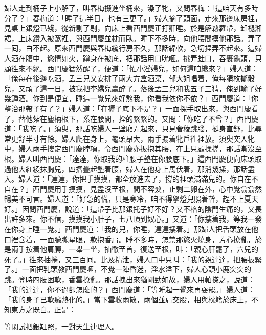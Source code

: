 婦人走到桶子上小解了，叫春梅掇進坐桶來，澡了牝，又問春梅：「這咱天有多時分了？」春梅道：「睡了這半日，也有三更了。」婦人摘了頭面，走來那邊床房裡，見桌上銀燈已殘，從新剔了剔，向床上看西門慶正打鼾睡。於是解鬆羅帶，卸褪湘裙，上床鑽入被窩裡，與西門慶並枕而臥。睡下不多時，向他腰間摸他那話。弄了一囘，白不起。原來西門慶與春梅纔行房不久，那話綿軟，急切捏弄不起來。這婦人酒在腹中，慾情如火，蹲身在被底，把那話用口吮咂。挑弄蛙口，吞裹龜頭，只顧徃來不絕。西門慶猛然醒了，便道：「恠小淫婦兒，如何這咱纔來？」婦人道：「俺每在後邊吃酒，孟三兒又安排了兩大方盒酒菜，郁大姐唱着，俺每猜枚擲骰兒，又頑了這一日，被我把李嬌兒贏醉了。落後孟三兒和我五子三猜，俺到輸了好幾鍾酒。你到是便宜，睡這一覺兒來好熬我，你看我依你不依？」{}西門慶道：「你整治那帶子有了？」婦人道：「在褥子底下不是？」一面探手取出來，與西門慶看了，替他紮在麈柄根下，系在腰間，拴的緊緊的。又問：「你吃了不曾？」西門慶道：「我吃了。」須臾，那話吃婦人一壁廂弄起來，{}只見奢稜跳腦，挺身直舒，比尋常更舒半寸有餘。婦人爬在身上，龜頭昂大，兩手搧着牝戶徃裡放。須臾突入牝中，婦人兩手摟定西門慶脖項，令西門慶亦扳抱其腰，在上只顧揉搓，那話漸沒至根。婦人叫西門慶：「達達，你取我的柱腰子墊在你腰底下。」這西門慶便向床頭取過他大紅綾抹胸兒，四摺疊起墊着腰，婦人在他身上馬伏着，那消幾揉，那話盡入。婦人道：「達達，你把手摸摸，都全放進去了，撐的裡頭滿滿兒的。你自在不自在？」西門慶用手摸摸，見盡沒至根，間不容髮，止剩二卵在外，心中覺翕翕然暢美不可言。婦人道：「好急的慌，只是寒冷，咱不得拏燈兒照着幹，趕不上夏天好。」因問西門慶，說道：「這帶子比那銀托子好不好？又不格的陰門生痛的，又長出許多來。你不信，摸摸我小肚子，七八頂到奴心。」又道：「你摟着我，等我一發在你身上睡一覺。」西門慶道：「我的兒，你睡，達達摟着。」那婦人把舌頭放在他口裡含着，一面朦朧星眼，款抱香肩。睡不多時，怎禁那慾火燒身，芳心撩亂，於是兩手按着他肩膊，一舉一坐，抽徹至首，復送至根，叫：「親心肝罷了，六兒的死了。」徃來抽捲，又三百囘。比及精泄，婦人口中只叫：「我的親達達，把腰扳緊了。」一面把乳頭教西門慶咂，不覺一陣昏迷，淫水溢下，婦人心頭小鹿突突的跳。登時四肢困軟，香雲撩亂。那話拽出來猶剛勁如故，婦人用帕搽之，說道：「我的達達，你不過卻怎麼的？」西門慶道：「等睡起一覺來再耍罷。」婦人道：「我的身子已軟癱熱化的。」{}當下雲收雨散，兩個並肩交股，相與枕籍於床上，不知東方之既白。正是：

等閑試把銀缸照，一對天生連理人。

